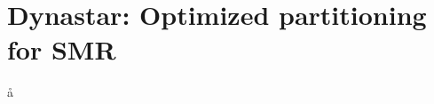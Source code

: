 \chapter[Dynastar: Optimized partitioning for SMR]{Dynastar: Optimized partitioning for SMR}
\label{sec:dynastar}








å
